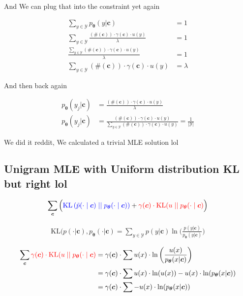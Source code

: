 \documentclass{article}
\newcommand{\KL}{\mathrm{KL}}
\newcommand{\uniform}{u}
\newcommand{\vtheta}{\boldsymbol{\theta}}
\newcommand{\model}{p_{\vtheta}}
\newcommand{\context}{\boldsymbol{c}}
\begin{document}
			And We can plug that into the constraint yet again
			
			\begin{align}
				\sum_{y\in\mathcal{Y}} \model(y|\context) &= 1\\
				\sum_{y\in\mathcal{Y}} \frac{(\#(\context))\cdot \gamma(\context)\cdot u(y)}{\lambda} &= 1\\
				 \frac{\sum_{y\in\mathcal{Y}} (\#(\context))\cdot \gamma(\context)\cdot u(y)}{\lambda} &= 1\\
				 \sum_{y\in\mathcal{Y}} (\#(\context))\cdot \gamma(\context)\cdot u(y) &= \lambda
			\end{align}
			
			And then back again
			
			\begin{align}
				\model(y_j|\context)  &= \frac{(\#(\context))\cdot \gamma(\context)\cdot u(y)}{\lambda}\\
				\model(y_j|\context)  &= \frac{(\#(\context))\cdot \gamma(\context)\cdot u(y)}{\sum_{y\in\mathcal{Y}} (\#(\context))\cdot \gamma(\context)\cdot u(y)} = \frac{1}{|\mathcal{Y}|}
			\end{align}
			
			We did it reddit, We calculated a trivial MLE solution lol
			
	\subsection{Unigram MLE with Uniform distribution KL but right lol}
	
		\begin{align}
	  		\sum_{\context} \Big( {\color{blue} \KL\left(\tilde{p}(\cdot 			\mid \context) \mid\mid \model(\cdot \mid \context)					\right)} + {\color{red}\gamma(\context) \cdot 						\KL(\uniform \mid\mid \model(\cdot \mid \context)}\Big)
		\end{align}
		
		\begin{align}
			\KL(p(\cdot|\context), \model(\cdot|\context) = \sum_{y\in\mathcal{Y}} p(y|\context)\ln\bigg(\frac{p(y|\context)}{\model(y|\context)} \bigg)
		\end{align}
		
		\begin{align}
			\sum_{\context} {\color{red}\gamma(\context) \cdot 						\KL(\uniform \mid\mid \model(\cdot \mid \context)} &= \gamma(\context)\cdot\sum u(x)\cdot \ln\bigg(\frac{u(x)}{\model(x|\context)}\bigg)\\
		&= \gamma(\context)\cdot\sum u(x)\cdot\ln(u(x)) - u(x)\cdot\ln(\model(x|\context))\\
		&= \gamma(\context)\cdot\sum - u(x)\cdot\ln(\model(x|\context))
		\end{align}
		
\end{document}
